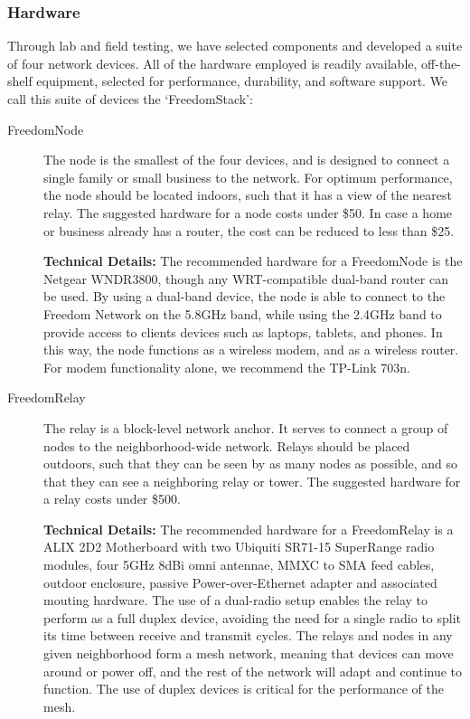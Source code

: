 \subsubsection{Hardware}
Through lab and field testing, we have selected components and developed a suite
of four network devices. All of the hardware employed is readily available,
off-the-shelf equipment, selected for performance, durability, and software
support. We call this suite of devices the `FreedomStack':

\begin{description}
\item[FreedomNode] The node is the smallest of the four devices, and is designed
to connect a single family or small business to the network. For optimum
performance, the node should be located indoors, such that it has a view of the nearest
relay. The suggested hardware for a node costs under \$50. In case a home or
business already has a router, the cost can be reduced to less than \$25.\par
{\bf Technical Details:} The recommended
hardware for a FreedomNode is the Netgear WNDR3800, though any WRT-compatible
dual-band router can be used. By using a dual-band device, the node is able to
connect to the Freedom Network on the 5.8GHz band, while using the 2.4GHz band to
provide access to clients devices such as laptops, tablets, and phones. In this
way, the node functions as a wireless modem, and as a wireless router. For modem
functionality alone, we recommend the TP-Link 703n.

\item[FreedomRelay] The relay is a block-level network anchor. It serves to
connect a group of nodes to the neighborhood-wide network.   Relays should be placed outdoors,
such that they can be seen by as many nodes as possible, and so that they can
see a neighboring relay or tower. The suggested hardware for a relay costs under
\$500. \par
{\bf Technical Details:} The recommended
hardware for a FreedomRelay is a ALIX 2D2 Motherboard with two Ubiquiti SR71-15
SuperRange radio modules, four 5GHz 8dBi omni antennae, MMXC to SMA feed cables,
outdoor enclosure, passive Power-over-Ethernet adapter and associated
mouting hardware.  The use of a dual-radio setup enables the relay 
to perform as a full duplex device, avoiding the need for a single radio to split
its time between receive and transmit cycles. The relays and nodes in any given
neighborhood form a mesh network, meaning that devices can move around or power
off, and the rest of the network will adapt and continue to function. The use of
duplex devices is critical for the performance of the mesh.


\end{description}
